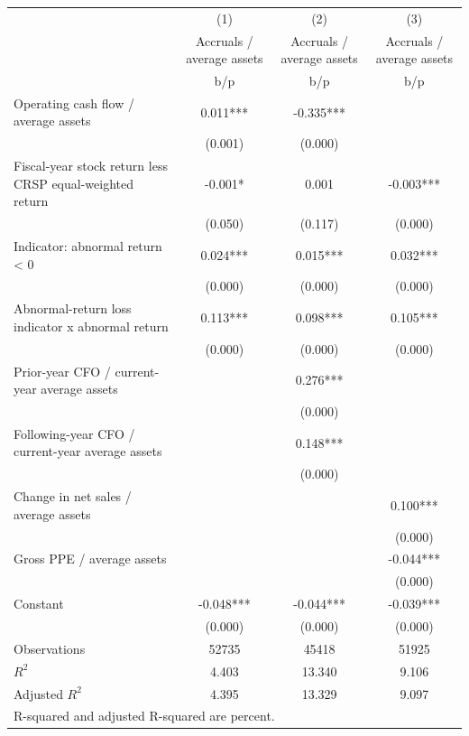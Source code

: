 {
\def\sym#1{\ifmmode^{#1}\else\(^{#1}\)\fi}
\begin{tabular}{l*{3}{c}}
\hline\hline
                    &\multicolumn{1}{c}{(1)}&\multicolumn{1}{c}{(2)}&\multicolumn{1}{c}{(3)}\\
                    &\multicolumn{1}{c}{Accruals / average assets}&\multicolumn{1}{c}{Accruals / average assets}&\multicolumn{1}{c}{Accruals / average assets}\\
                    &         b/p   &         b/p   &         b/p   \\
\hline
Operating cash flow / average assets&       0.011***&      -0.335***&               \\
                    &     (0.001)   &     (0.000)   &               \\
Fiscal-year stock return less CRSP equal-weighted return&      -0.001*  &       0.001   &      -0.003***\\
                    &     (0.050)   &     (0.117)   &     (0.000)   \\
Indicator: abnormal return < 0&       0.024***&       0.015***&       0.032***\\
                    &     (0.000)   &     (0.000)   &     (0.000)   \\
Abnormal-return loss indicator x abnormal return&       0.113***&       0.098***&       0.105***\\
                    &     (0.000)   &     (0.000)   &     (0.000)   \\
Prior-year CFO / current-year average assets&               &       0.276***&               \\
                    &               &     (0.000)   &               \\
Following-year CFO / current-year average assets&               &       0.148***&               \\
                    &               &     (0.000)   &               \\
Change in net sales / average assets&               &               &       0.100***\\
                    &               &               &     (0.000)   \\
Gross PPE / average assets&               &               &      -0.044***\\
                    &               &               &     (0.000)   \\
Constant            &      -0.048***&      -0.044***&      -0.039***\\
                    &     (0.000)   &     (0.000)   &     (0.000)   \\
\hline
Observations        &       52735   &       45418   &       51925   \\
\(R^{2}\)           &       4.403   &      13.340   &       9.106   \\
Adjusted \(R^{2}\)  &       4.395   &      13.329   &       9.097   \\
\hline\hline
\multicolumn{4}{l}{\footnotesize R-squared and adjusted R-squared are percent.}\\
\end{tabular}
}
